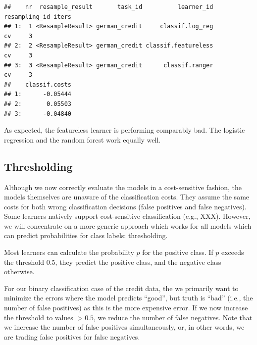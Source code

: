 \documentclass[]{scrbook}
\newenvironment{Shaded}{\begin{snugshade}}{\end{snugshade}}
\newcommand{\CommentTok}[1]{\textcolor[rgb]{0.56,0.35,0.01}{\textit{#1}}}
\newcommand{\DataTypeTok}[1]{\textcolor[rgb]{0.13,0.29,0.53}{#1}}
\newcommand{\KeywordTok}[1]{\textcolor[rgb]{0.13,0.29,0.53}{\textbf{#1}}}
\newcommand{\NormalTok}[1]{#1}
\newcommand{\OperatorTok}[1]{\textcolor[rgb]{0.81,0.36,0.00}{\textbf{#1}}}
\newcommand{\StringTok}[1]{\textcolor[rgb]{0.31,0.60,0.02}{#1}}
\renewenvironment{Shaded} {\begin{snugshade}\small} {\end{snugshade}}
\begin{document}
\begin{verbatim}
##    nr  resample_result       task_id          learner_id resampling_id iters
## 1:  1 <ResampleResult> german_credit     classif.log_reg            cv     3
## 2:  2 <ResampleResult> german_credit classif.featureless            cv     3
## 3:  3 <ResampleResult> german_credit      classif.ranger            cv     3
##    classif.costs
## 1:      -0.05444
## 2:       0.05503
## 3:      -0.04840
\end{verbatim}

As expected, the featureless learner is performing comparably bad.
The logistic regression and the random forest work equally well.

\hypertarget{thresholding}{%
\subsection{Thresholding}\label{thresholding}}

Although we now correctly evaluate the models in a cost-sensitive fashion, the models themselves are unaware of the classification costs.
They assume the same costs for both wrong classification decisions (false positives and false negatives).
Some learners natively support cost-sensitive classification (e.g., XXX).
However, we will concentrate on a more generic approach which works for all models which can predict probabilities for class labels: thresholding.

Most learners can calculate the probability \(p\) for the positive class.
If \(p\) exceeds the threshold \(0.5\), they predict the positive class, and the negative class otherwise.

For our binary classification case of the credit data, the we primarily want to minimize the errors where the model predicts ``good'', but truth is ``bad'' (i.e., the number of false positives) as this is the more expensive error.
If we now increase the threshold to values \(> 0.5\), we reduce the number of false negatives.
Note that we increase the number of false positives simultaneously, or, in other words, we are trading false positives for false negatives.

\begin{Shaded}
\end{Shaded}
\end{document}
